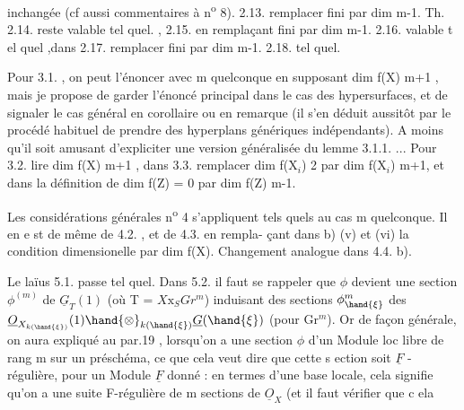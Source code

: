 
inchangée (cf aussi  commentaires à n\textsuperscript{o} 8). 2.13. remplacer fini
par dim \hand{$\leqslant$} m-1. Th. 2.14. reste valable tel quel. , 2.15. en
remplaçant fini par dim \hand{$\leqslant$} m-1. 2.16. valable t el quel ,dans
 2.17. remplacer fini par dim \hand{$\leqslant$} m-1. 2.18. tel quel.

Pour 3.1. , on peut l'énoncer avec m quelconque en supposant
dim f(X) \hand{$\geqslant$} m+1 , mais je propose de garder l'énoncé principal dans
le cas des hypersurfaces, et de signaler le cas général en corollaire
ou en remarque (il s'en déduit aussitôt par le procédé habituel de
prendre des hyperplans génériques indépendants). A moins qu'il soit
amusant d'expliciter une version généralisée du lemme 3.1.1. ...
Pour 3.2. lire dim f(X)\hand{$\geqslant$} m+1 , dans 3.3. remplacer dim f(X$_i$) \hand{$\geqslant$} 2
par dim f(X$_i$)\hand{$\geqslant$} m+1, et dans la définition de  dim f(Z) = 0
par dim f(Z) \hand{$\leqslant$} m-1.

Les considérations générales  n\textsuperscript{o} 4 s'appliquent tels quels
au cas m quelconque. Il en e st de même de 4.2. , et de 4.3. en rempla-%
çant dans b) (v) et (vi) la condition dimensionelle par
dim f(X). Changement analogue dans 4.4. b).

Le laïus 5.1. passe tel quel. Dans 5.2. il faut se rappeler
que $\phi$ devient une section $\phi^{(m)}$ de $\underline{G}_T(1)$ (où T 
 = $X\mathrm{x}_S Gr^m$)  induisant des sections
$\phi^m_{\hand{\xi}}$ des   $\underline{O}_{X_{k(\hand{\xi})}}(1)\hand{\otimes}_{k(\hand{\xi})}\underline{G}(\hand{\xi})$ (pour \hand{$\xi \in$} Gr$^m$). Or
de façon générale, on aura expliqué au par.19 , lorsqu'on a une
\placedmargin{$\|$} section $\phi$ d'un Module loc libre de rang m sur un préschéma, ce que
\placedmargin{$\|$} cela veut dire que cette s ection soit $\underline{F}$ -régulière, pour un Module
\placedmargin{$\|$} $\underline{F}$ donné : en termes d'une base locale, cela signifie qu'on a une
\placedmargin{$\|$} suite F-régulière de m sections de $\underline{O}_X$ (et il faut vérifier que c ela

